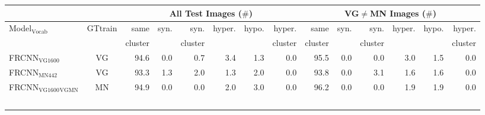 \begin{table}[t]
	\centering
	\small
	\begin{tabular}{l|c|r@{~}|r@{~}r@{~}r@{~}r@{~}r@{~}||r@{~}|r@{~}r@{~}r@{~}r@{~}r@{~}}
		\toprule
		& & \multicolumn{6}{c}{All Test Images ($\#$)} 
		& \multicolumn{6}{c}{VG$\neq$MN Images ($\#$)}\\
		\toprule
		Model$_{\text{Vocab}}$ &  GTtrain & same &  syn. &  syn. &  hyper. &  hypo. &  hyper. &  same &  syn. &  syn. &  hyper. &  hypo. &  hyper. \\
		& 	&  cluster &  & cluster & & & cluster 
		& cluster  &  & cluster & & & cluster \\
		\midrule
		FRCNN$_{\text{VG1600}}$ & VG     %
		&                  94.6 &              0.0 &                 0.7 &               3.4 &              1.3 &                  0.0 &                  95.5 &              0.0 &                 0.0 &               3.0 &              1.5 &                  0.0 \\
		FRCNN$_{\text{MN442}}$ & VG %
		&                  93.3 &              1.3 &                 2.0 &               1.3 &              2.0 &                  0.0 &                  93.8 &              0.0 &                 3.1 &               1.6 &              1.6 &                  0.0 \\
		\midrule \midrule
		FRCNN$_{\text{VG1600}}$$_{\text{VGMN}}$ & MN %
		&                  94.9 &              0.0 &                 0.0 &               2.0 &              3.0 &                  0.0 &                  96.2 &              0.0 &                 0.0 &               1.9 &              1.9 &                  0.0 \\
$$
\end{tabular}
\end{table}
